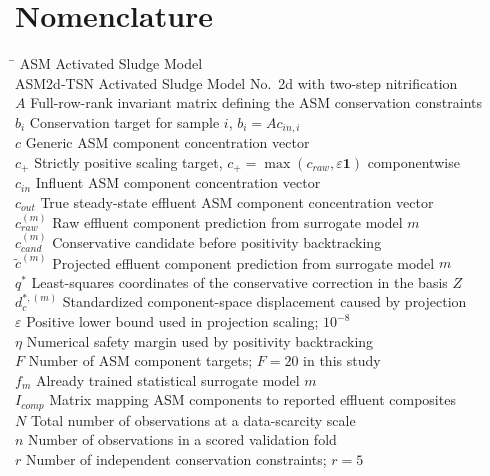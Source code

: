 \documentclass[a4paper,fleqn]{cas-sc}
\begin{document}
\section*{Nomenclature}
\begin{tabbing}
\hspace{3.9cm} \= \kill
ASM \> Activated Sludge Model \\
ASM2d-TSN \> Activated Sludge Model No.\ 2d with two-step nitrification \\
$A$ \> Full-row-rank invariant matrix defining the ASM conservation constraints \\
$b_i$ \> Conservation target for sample $i$, $b_i = A c_{in,i}$ \\
$c$ \> Generic ASM component concentration vector \\
$c_+$ \> Strictly positive scaling target, $c_+ = \max(c_{raw},\varepsilon\mathbf{1})$ componentwise \\
$c_{in}$ \> Influent ASM component concentration vector \\
$c_{out}$ \> True steady-state effluent ASM component concentration vector \\
$c_{raw}^{(m)}$ \> Raw effluent component prediction from surrogate model $m$ \\
$c_{cand}^{(m)}$ \> Conservative candidate before positivity backtracking \\
$\tilde{c}^{(m)}$ \> Projected effluent component prediction from surrogate model $m$ \\
$q^*$ \> Least-squares coordinates of the conservative correction in the basis $Z$ \\
$d_c^{*,(m)}$ \> Standardized component-space displacement caused by projection \\
$\varepsilon$ \> Positive lower bound used in projection scaling; $10^{-8}$ \\
$\eta$ \> Numerical safety margin used by positivity backtracking \\
$F$ \> Number of ASM component targets; $F=20$ in this study \\
$f_m$ \> Already trained statistical surrogate model $m$ \\
$I_{comp}$ \> Matrix mapping ASM components to reported effluent composites \\
$N$ \> Total number of observations at a data-scarcity scale \\
$n$ \> Number of observations in a scored validation fold \\
$r$ \> Number of independent conservation constraints; $r=5$ \\

\end{tabbing}
\end{document}
